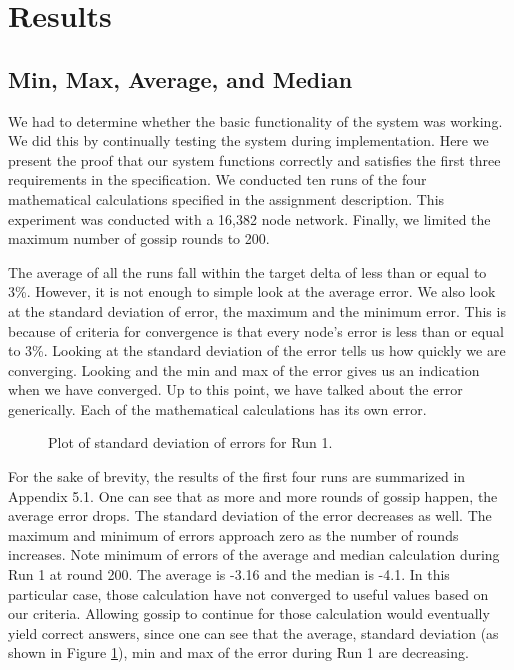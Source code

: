 \section{Results}
\subsection{Min, Max, Average, and Median}
We had to determine whether the basic functionality of the system was working. We did this by continually testing the system during implementation. Here we present the proof that our system functions correctly and satisfies the first three requirements in the specification. We conducted ten runs of the four mathematical calculations specified in the assignment description. This experiment was conducted with a 16,382 node network. Finally, we limited the maximum number of gossip rounds to 200.

The average of all the runs fall within the target delta of less than or equal to 3\%. However, it is not enough to simple look at the average error. We also look at the standard deviation of error, the maximum and the minimum error. This is because of criteria for convergence is that every node's error is less than or equal to 3\%. Looking at the standard deviation of the error tells us how quickly we are converging. Looking and the min and max of the error gives us an indication when we have converged. Up to this point, we have talked about the error generically. Each of the mathematical calculations has its own error. 

\begin{figure}[ht!]
\centering
\setlength\fboxsep{0pt}
\setlength\fboxrule{0.5pt}
\caption{Plot of standard deviation of errors for Run 1.}
\label{fig:Run1_stdev}
\end{figure}


For the sake of brevity, the results of the first four runs are summarized in Appendix 5.1. One can see that as more and more rounds of gossip happen, the average error drops. The standard deviation of the error decreases as well. The maximum and minimum of errors approach zero as the number of rounds increases. Note minimum of errors of the average and median calculation during Run 1 at round 200. The average is -3.16 and the median is -4.1. In this particular case, those calculation have not converged to useful values based on our criteria. Allowing gossip to continue for those calculation would eventually yield correct answers, since one can see that the average, standard deviation (as shown in Figure \ref{fig:Run1_stdev}), min and max of the error during Run 1 are decreasing. 

